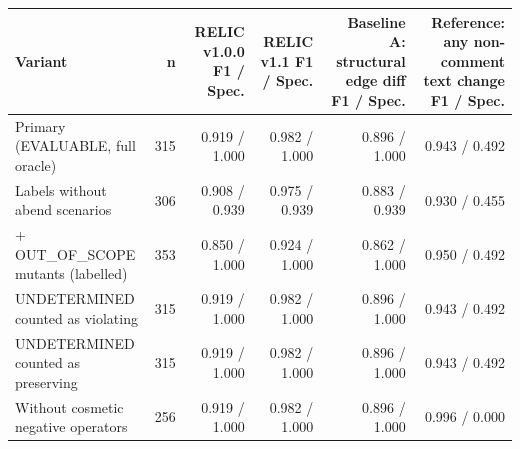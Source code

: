 \begin{tabular}{lrrrrr}
\toprule
Variant & n & RELIC v1.0.0 F1 / Spec. & RELIC v1.1 F1 / Spec. & Baseline A: structural edge diff F1 / Spec. & Reference: any non-comment text change F1 / Spec. \\
\midrule
Primary (EVALUABLE, full oracle) & 315 & 0.919 / 1.000 & 0.982 / 1.000 & 0.896 / 1.000 & 0.943 / 0.492 \\
Labels without abend scenarios & 306 & 0.908 / 0.939 & 0.975 / 0.939 & 0.883 / 0.939 & 0.930 / 0.455 \\
+ OUT\_OF\_SCOPE mutants (labelled) & 353 & 0.850 / 1.000 & 0.924 / 1.000 & 0.862 / 1.000 & 0.950 / 0.492 \\
UNDETERMINED counted as violating & 315 & 0.919 / 1.000 & 0.982 / 1.000 & 0.896 / 1.000 & 0.943 / 0.492 \\
UNDETERMINED counted as preserving & 315 & 0.919 / 1.000 & 0.982 / 1.000 & 0.896 / 1.000 & 0.943 / 0.492 \\
Without cosmetic negative operators & 256 & 0.919 / 1.000 & 0.982 / 1.000 & 0.896 / 1.000 & 0.996 / 0.000 \\
\bottomrule
\end{tabular}
